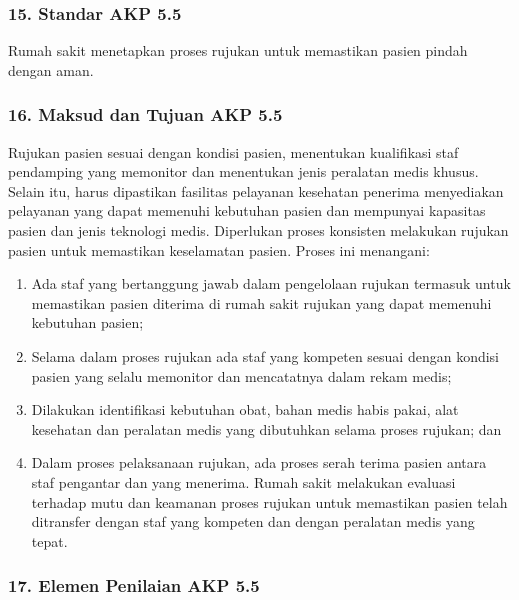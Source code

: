 \documentclass[
]{book}
\providecommand{\tightlist}{%
  \setlength{\itemsep}{0pt}\setlength{\parskip}{0pt}}
\begin{document}
\hypertarget{standar-akp-5.5}{%
\subsubsection*{15. Standar AKP 5.5}\label{standar-akp-5.5}}

Rumah sakit menetapkan proses rujukan untuk memastikan pasien pindah dengan aman.

\hypertarget{maksud-dan-tujuan-akp-5.5}{%
\subsubsection*{16. Maksud dan Tujuan AKP 5.5}\label{maksud-dan-tujuan-akp-5.5}}

Rujukan pasien sesuai dengan kondisi pasien, menentukan kualifikasi staf pendamping yang memonitor dan menentukan jenis peralatan medis khusus. Selain itu, harus dipastikan fasilitas pelayanan kesehatan penerima menyediakan pelayanan yang dapat memenuhi kebutuhan pasien dan mempunyai kapasitas pasien dan jenis teknologi medis. Diperlukan proses konsisten melakukan rujukan pasien untuk memastikan keselamatan pasien. Proses ini menangani:

\begin{enumerate}
\def\labelenumi{\alph{enumi}.}
\tightlist
\item
  Ada staf yang bertanggung jawab dalam pengelolaan rujukan termasuk untuk memastikan pasien diterima di rumah sakit rujukan yang dapat memenuhi kebutuhan pasien;
\item
  Selama dalam proses rujukan ada staf yang kompeten sesuai dengan kondisi pasien yang selalu memonitor dan mencatatnya dalam rekam medis;
\item
  Dilakukan identifikasi kebutuhan obat, bahan medis habis pakai, alat kesehatan dan peralatan medis yang dibutuhkan selama proses rujukan; dan
\item
  Dalam proses pelaksanaan rujukan, ada proses serah terima pasien antara staf pengantar dan yang menerima. Rumah sakit melakukan evaluasi terhadap mutu dan keamanan proses rujukan untuk memastikan pasien telah ditransfer dengan staf yang kompeten dan dengan peralatan medis yang tepat.
\end{enumerate}

\hypertarget{elemen-penilaian-akp-5.5}{%
\subsubsection*{17. Elemen Penilaian AKP 5.5}\label{elemen-penilaian-akp-5.5}}
\end{document}

